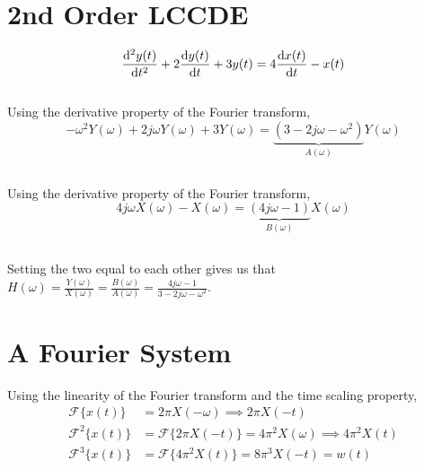 \documentclass{article}
\newcommand{\F}{\mathcal{F}}
\begin{document}
\section{2nd Order LCCDE}

\begin{equation}
    \dv[2]{y(t)}{t} + 2\dv{y(t)}{t} + 3 y(t) = 4\dv{x(t)}{t} - x(t)
\end{equation}

\subsection{}

Using the derivative property of the Fourier transform,
\begin{equation}
    -\omega^2 Y(\omega) + 2j \omega Y(\omega) + 3 Y(\omega) = \underbrace{(3 - 2j \omega - \omega^2)}_{A(\omega)} Y(\omega)
\end{equation}

\subsection{}

Using the derivative property of the Fourier transform,
\begin{equation}
    4j \omega X(\omega) - X(\omega) = \underbrace{(4j \omega - 1)}_{B(\omega)} X(\omega)
\end{equation}

\subsection{}

Setting the two equal to each other gives us that \(H(\omega) = \frac{Y(\omega)}{X(\omega)} = \frac{B(\omega)}{A(\omega)} = \frac{4j \omega - 1}{3 - 2j \omega - \omega^2}\).

\section{A Fourier System}

Using the linearity of the Fourier transform and the time scaling property,
\begin{align}
    \F\{x(t)\} &= 2\pi X(-\omega) \implies 2\pi X(-t)\\
    \F^2\{x(t)\} &= \F\{2\pi X(-t)\} = 4\pi^2 X(\omega) \implies 4\pi^2 X(t) \\
    \F^3\{x(t)\} &= \F\{4\pi^2 X(t)\} = 8\pi^3 X(-t) = w(t)
\end{align}
\end{document}
